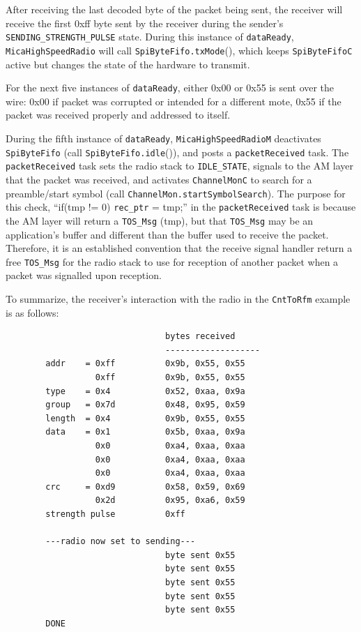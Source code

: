 \documentclass[11pt]{article}
\begin{document}
After receiving the last decoded byte of the packet being sent, the
receiver will receive the first 0xff byte sent by the receiver during
the sender's {\tt SENDING\_STRENGTH\_PULSE} state. During this instance of
{\tt dataReady}, {\tt MicaHighSpeedRadio} will call {\tt SpiByteFifo.txMode}(), which
keeps {\tt SpiByteFifoC} active but changes the state of the hardware to transmit.

For the next five instances of {\tt dataReady}, either 0x00 or 0x55 is sent
over the wire: 0x00 if packet was corrupted or intended for a
different mote, 0x55 if the packet was received properly and addressed
to itself.

During the fifth instance of {\tt dataReady}, {\tt MicaHighSpeedRadioM}
deactivates {\tt SpiByteFifo} (call {\tt SpiByteFifo.idle}()), and posts a
{\tt packetReceived} task. The {\tt packetReceived} task sets the radio stack to
{\tt IDLE\_STATE}, signals to the AM layer that the packet was received, and
activates {\tt ChannelMonC} to search for a preamble/start symbol (call
{\tt ChannelMon.startSymbolSearch}). The purpose for this check, ``if(tmp !=
0) {\tt rec\_ptr} = tmp;'' in the {\tt packetReceived} task is because the AM layer
will return a {\tt TOS\_Msg} (tmp), but that {\tt TOS\_Msg} may be an application's buffer
and different than the buffer used to receive the packet. Therefore,
it is an established convention that the receive signal handler return
a free {\tt TOS\_Msg} for the radio stack to use for reception of another
packet when a packet was signalled upon reception. 

To summarize, the receiver's interaction with the radio in the
{\tt CntToRfm} example is as follows:
\begin{verbatim}
                                bytes received
                                -------------------
        addr    = 0xff          0x9b, 0x55, 0x55
                  0xff          0x9b, 0x55, 0x55
        type    = 0x4           0x52, 0xaa, 0x9a
        group   = 0x7d          0x48, 0x95, 0x59
        length  = 0x4           0x9b, 0x55, 0x55
        data    = 0x1           0x5b, 0xaa, 0x9a
                  0x0           0xa4, 0xaa, 0xaa
                  0x0           0xa4, 0xaa, 0xaa
                  0x0           0xa4, 0xaa, 0xaa
        crc     = 0xd9          0x58, 0x59, 0x69
                  0x2d          0x95, 0xa6, 0x59
        strength pulse          0xff

        ---radio now set to sending---
                                byte sent 0x55
                                byte sent 0x55
                                byte sent 0x55
                                byte sent 0x55
                                byte sent 0x55
        DONE
\end{verbatim}
\end{document}
